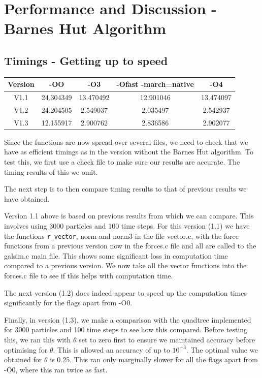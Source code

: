 \section{Performance and Discussion - Barnes Hut Algorithm}
\subsection{Timings - Getting up to speed}
\begin{center}
  \begin{tabular}{|c|c|c|c|c|}
    \hline
    Version & -OO & -O3 & -Ofast -march=native & -O4\\
    \hline
    V1.1 & 24.304349 & 13.470492 & 12.901046 & 13.474097\\
    V1.2 & 24.204505 & 2.549037 & 2.035497 & 2.542937\\
    V1.3 & 12.155917 & 2.900762 & 2.836586 & 2.902077\\
    \hline
  \end{tabular}
\end{center}
Since the functions are now spread over several files, we need to check that we have as efficient timings as in the version without the Barnes Hut algorithm. To test this, we first use a check file to make sure our results are accurate. The timing results of this we omit.

The next step is to then compare timing results to that of previous results we have obtained.

Version 1.1 above is based on previous results from which we can compare. This involves using 3000 particles and 100 time steps. For this version (1.1) we have the functions \verb|r_vector|, norm and norm3 in the file vector.c, with the force functions from a previous version now in the forces.c file and all are called to the galsim.c main file. This shows some significant loss in computation time compared to a previous version. We now take all the vector functions into the forces.c file to see if this helps with computation time.

The next version (1.2) does indeed appear to speed up the computation times significantly for the flags apart from -O0.

Finally, in version (1.3), we make a comparison with the quadtree implemented for 3000 particles and 100 time steps to see how this compared. Before testing this, we ran this with $\theta$ set to zero first to ensure we maintained accuracy before optimising for $\theta$. This is allowed an accuracy of up to $10^{-3}$. The optimal value we obtained for $\theta$ is 0.25. This ran only marginally slower for all the flags apart from -O0, where this ran twice as fast.
